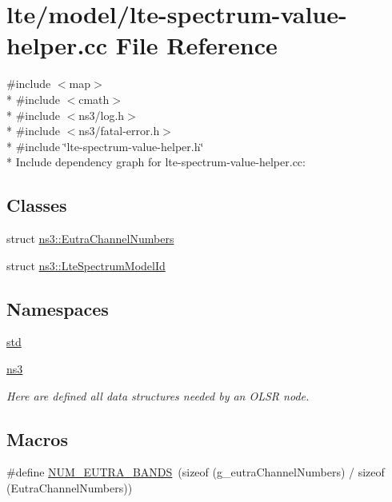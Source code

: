 \hypertarget{lte-spectrum-value-helper_8cc}{}\section{lte/model/lte-\/spectrum-\/value-\/helper.cc File Reference}
\label{lte-spectrum-value-helper_8cc}
{\ttfamily \#include $<$map$>$}\\*
{\ttfamily \#include $<$cmath$>$}\\*
{\ttfamily \#include $<$ns3/log.\+h$>$}\\*
{\ttfamily \#include $<$ns3/fatal-\/error.\+h$>$}\\*
{\ttfamily \#include \char`\"{}lte-\/spectrum-\/value-\/helper.\+h\char`\"{}}\\*
Include dependency graph for lte-\/spectrum-\/value-\/helper.cc\+:
\subsection*{Classes}
\begin{DoxyCompactItemize}
\item 
struct \hyperlink{structns3_1_1EutraChannelNumbers}{ns3\+::\+Eutra\+Channel\+Numbers}
\item 
struct \hyperlink{structns3_1_1LteSpectrumModelId}{ns3\+::\+Lte\+Spectrum\+Model\+Id}
\end{DoxyCompactItemize}
\subsection*{Namespaces}
\begin{DoxyCompactItemize}
\item 
 \hyperlink{namespacestd}{std}
\item 
 \hyperlink{namespacens3}{ns3}
\begin{DoxyCompactList}\small\item\em Here are defined all data structures needed by an O\+L\+SR node. \end{DoxyCompactList}\end{DoxyCompactItemize}
\subsection*{Macros}
\begin{DoxyCompactItemize}
\item 
\#define \hyperlink{lte-spectrum-value-helper_8cc_a1a0cf1fbef963a28fb2985919229db33}{N\+U\+M\+\_\+\+E\+U\+T\+R\+A\+\_\+\+B\+A\+N\+DS}~(sizeof (g\+\_\+eutra\+Channel\+Numbers) / sizeof (Eutra\+Channel\+Numbers))
\end{DoxyCompactItemize}
